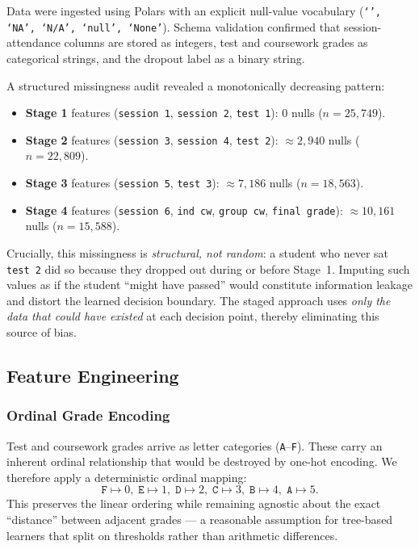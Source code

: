\documentclass[8pt,twocolumn]{extarticle}
\begin{document}
Data were ingested using Polars with an explicit null-value vocabulary
(\texttt{`', `NA', `N/A', `null', `None'}).  Schema validation confirmed that
session-attendance columns are stored as integers, test and coursework grades as
categorical strings, and the dropout label as a binary string.

A structured missingness audit revealed a monotonically decreasing pattern:
\begin{itemize}
  \item \textbf{Stage 1} features (\texttt{session 1}, \texttt{session 2},
        \texttt{test 1}): $0$ nulls ($n = 25{,}749$).
  \item \textbf{Stage 2} features (\texttt{session 3}, \texttt{session 4},
        \texttt{test 2}): $\approx 2{,}940$ nulls ($n = 22{,}809$).
  \item \textbf{Stage 3} features (\texttt{session 5}, \texttt{test 3}):
        $\approx 7{,}186$ nulls ($n = 18{,}563$).
  \item \textbf{Stage 4} features (\texttt{session 6}, \texttt{ind cw},
        \texttt{group cw}, \texttt{final grade}):
        $\approx 10{,}161$ nulls ($n = 15{,}588$).
\end{itemize}
Crucially, this missingness is \emph{structural, not random}: a student who never sat
\texttt{test 2} did so because they dropped out during or before Stage~1.
Imputing such values as if the student ``might have passed'' would constitute information
leakage and distort the learned decision boundary.
The staged approach uses \emph{only the data that could have existed} at each decision
point, thereby eliminating this source of bias.

\subsection{Feature Engineering}

\subsubsection{Ordinal Grade Encoding}
Test and coursework grades arrive as letter categories (\texttt{A}--\texttt{F}).
These carry an inherent ordinal relationship that would be destroyed by one-hot encoding.
We therefore apply a deterministic ordinal mapping:
\[
  \texttt{F} \mapsto 0,\;
  \texttt{E} \mapsto 1,\;
  \texttt{D} \mapsto 2,\;
  \texttt{C} \mapsto 3,\;
  \texttt{B} \mapsto 4,\;
  \texttt{A} \mapsto 5.
\]
This preserves the linear ordering while remaining agnostic about the exact
``distance'' between adjacent grades --- a reasonable assumption for tree-based
learners that split on thresholds rather than arithmetic differences.
\end{document}
